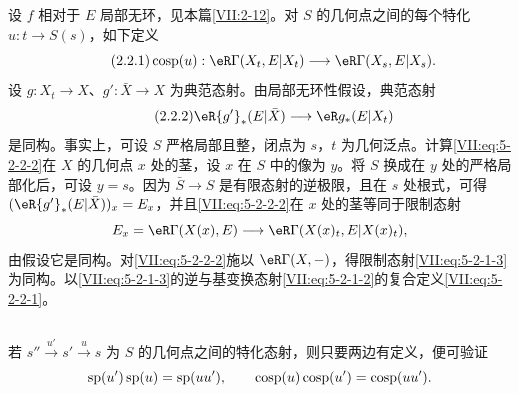 \subsection{}\label{VII:5-2-2}
设 $f$ 相对于 $E$ 局部无环，见本篇\ref{VII:2-12}。对 $S$ 的几何点之间的每个特化 $u:t\to S(s)$，如下定义
\begin{equation*}\tag{2.2.1}\label{VII:eq:5-2-2-1}
 \cosp(u):\eR\Gamma(X_t,E|X_t)\longrightarrow\eR\Gamma(X_s,E|X_s).
\end{equation*}
设 $g:X_t\to X$、$g':\bar X\to X$ 为典范态射。由局部无环性假设，典范态射
\begin{equation*}\tag{2.2.2}\label{VII:eq:5-2-2-2}
 \eR{g'}_\ast(E|\bar X)\longrightarrow\eR g_\ast(E|X_t)
\end{equation*}
是同构。事实上，可设 $S$ 严格局部且整，闭点为 $s$，$t$ 为几何泛点。计算\eqref{VII:eq:5-2-2-2}在 $X$ 的几何点 $x$ 处的茎，设 $x$ 在 $S$ 中的像为 $y$。将 $S$ 换成在 $y$ 处的严格局部化后，可设 $y=s$。因为 $\bar S\to S$ 是有限态射的逆极限，且在 $s$ 处根式，可得 $(\eR{g'}_\ast(E|\bar X))_x=E_x$，并且\eqref{VII:eq:5-2-2-2}在 $x$ 处的茎等同于限制态射
\[
 E_x=\eR\Gamma(X(x),E)\longrightarrow\eR\Gamma(X(x)_t,E|X(x)_t),
\]
由假设它是同构。对\eqref{VII:eq:5-2-2-2}施以 $\eR\Gamma(X,-)$，得限制态射\eqref{VII:eq:5-2-1-3}为同构。以\eqref{VII:eq:5-2-1-3}的逆与基变换态射\eqref{VII:eq:5-2-1-2}的复合定义\eqref{VII:eq:5-2-2-1}。
\subsection{}\label{VII:5-2-3}
若 $s''\xrightarrow{u'}s'\xrightarrow us$ 为 $S$ 的几何点之间的特化态射，则只要两边有定义，便可验证
\[
 \operatorname{sp}(u')\operatorname{sp}(u)=\operatorname{sp}(uu'),\qquad
 \operatorname{cosp}(u)\operatorname{cosp}(u')=\operatorname{cosp}(uu').
\]
